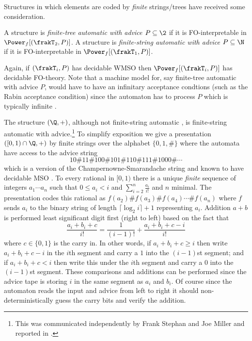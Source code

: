 Structures in which elements are coded by {\em finite} strings/trees have received some consideration. 

\begin{definition} \cite{CoLo07}
A structure is  {\em finite-tree automatic with advice $P \subseteq \2$} if it is FO-interpretable in $\Power_f[(\frakT_2,P)]$.
A structure is  {\em finite-string automatic with advice $P \subseteq \N$}  if it is FO-interpretable in $\Power_f[(\frakT_1,P)]$.
\end{definition}

Again, if $(\frakT_i,P)$ has decidable WMSO then $\Power_f[(\frakT_i,P)]$ has decidable FO-theory. Note that a machine model for, say finite-tree automatic with advice $P$, would
have to have an infinitary acceptance condtions (such as the Rabin acceptance condition) since the automaton has to process $P$ which is typically infinite \cite{CoLo07}.

\begin{example} The structure $(\Q,+)$, although not finite-string automatic \cite{Tsan11}, is finite-string automatic with 
advice.\footnote{This was communicated independently by Frank Stephan and Joe Miller and reported in \cite{Nies07}.}
To simplify exposition we give a presentation $([0,1) \cap \Q,+)$ by finite strings
over the alphabet $\{0,1,\#\}$ where the automata have access to the advice string
\[
10\#11\#100\#101\#110\#111\#1000\#\cdots
\]
which is a version of the Champernowne-Smarandache string and known to have decidable MSO \cite{Bara07}. 
To every rational in $[0,1)$ there is a unique {\em finite}
sequence of integers  $a_1 \cdots a_n$ such that $0 \leq a_i < i$ 
and $\sum_{i=2}^n \frac{a_i}{i!}$ and $n$ minimal. The presentation codes this rational as
$f(a_2)\#f(a_3)\#f(a_4) \cdots \#f(a_n)$ where $f$ sends $a_i$ to the binary string of length $\lceil  \log_2 i \rceil +1$  representing $a_i$. Addition $a+b$ is performed least significant digit first (right to left) based on the fact that 
\[
\frac{a_i + b_i + c}{i!} = \frac{1}{(i-1)!} + \frac{a_i + b_i + c - i}{i!}
\]
where $c \in \{0,1\}$ is the carry in. In other words, if $a_i+b_i+c \geq i$ then write $a_i+b_i+c-i$ in the $i$th segment and carry a $1$ into the $(i-1)$st segment; and if $a_i +b_i + c < i$ then write this under the $i$th segment and carry a $0$ into the $(i-1)$st segment.  These comparisons and additions can be performed since the advice tape is storing $i$ in the same segment as $a_i$ and $b_i$. Of course since the automaton reads the input and advice from left to right it should non-deterministically guess the carry bits and verify the addition.
\end{example}

